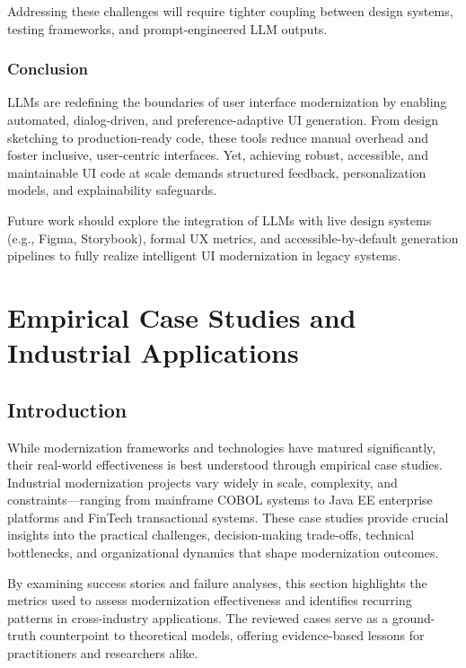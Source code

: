 \documentclass[12pt]{article}
\begin{document}
Addressing these challenges will require tighter coupling between design systems, testing frameworks, and prompt-engineered LLM outputs.

\subsubsection{Conclusion}

LLMs are redefining the boundaries of user interface modernization by enabling automated, dialog-driven, and preference-adaptive UI generation. From design sketching to production-ready code, these tools reduce manual overhead and foster inclusive, user-centric interfaces. Yet, achieving robust, accessible, and maintainable UI code at scale demands structured feedback, personalization models, and explainability safeguards.

Future work should explore the integration of LLMs with live design systems (e.g., Figma, Storybook), formal UX metrics, and accessible-by-default generation pipelines to fully realize intelligent UI modernization in legacy systems.

\section{Empirical Case Studies and Industrial Applications}

\subsection{Introduction}

While modernization frameworks and technologies have matured significantly, their real-world effectiveness is best understood through empirical case studies. Industrial modernization projects vary widely in scale, complexity, and constraints—ranging from mainframe COBOL systems to Java EE enterprise platforms and FinTech transactional systems. These case studies provide crucial insights into the practical challenges, decision-making trade-offs, technical bottlenecks, and organizational dynamics that shape modernization outcomes.

By examining success stories and failure analyses, this section highlights the metrics used to assess modernization effectiveness and identifies recurring patterns in cross-industry applications. The reviewed cases serve as a ground-truth counterpoint to theoretical models, offering evidence-based lessons for practitioners and researchers alike.
\end{document}
